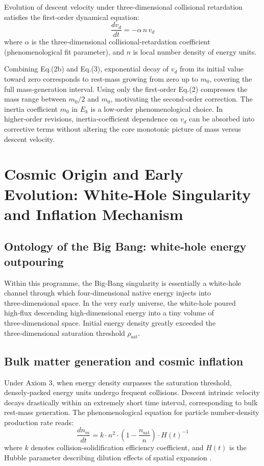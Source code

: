 \documentclass[12pt,a4paper]{article}
\begin{document}
Evolution of descent velocity under three‑dimensional collisional retardation satisfies the first‑order dynamical equation:
\begin{equation}
\frac{dv_d}{dt}=-\alpha\, n\, v_d
\end{equation}
where $\alpha$ is the three‑dimensional collisional‑retardation coefficient (phenomenological fit parameter), and $n$ is local number density of energy units.

Combining Eq.(2b) and Eq.(3), exponential decay of $v_d$ from its initial value toward zero corresponds to rest‑mass growing from zero up to $m_0$, covering the full mass‑generation interval. Using only the first‑order Eq.(2) compresses the mass range between $m_0/2$ and $m_0$, motivating the second‑order correction. The inertia coefficient $m_0$ in $E_k$ is a low‑order phenomenological choice. In higher‑order revisions, inertia‑coefficient dependence on $v_d$ can be absorbed into corrective terms without altering the core monotonic picture of mass versus descent velocity.

\section{Cosmic Origin and Early Evolution: White‑Hole Singularity and Inflation Mechanism}
\subsection{Ontology of the Big Bang: white‑hole energy outpouring}
Within this programme, the Big‑Bang singularity is essentially a white‑hole channel through which four‑dimensional native energy injects into three‑dimensional space. In the very early universe, the white‑hole poured high‑flux descending high‑dimensional energy into a tiny volume of three‑dimensional space. Initial energy density greatly exceeded the three‑dimensional saturation threshold $\rho_{\text{sat}}$.

\subsection{Bulk matter generation and cosmic inflation}
Under Axiom 3, when energy density surpasses the saturation threshold, densely‑packed energy units undergo frequent collisions. Descent intrinsic velocity decays drastically within an extremely short time interval, corresponding to bulk rest‑mass generation. The phenomenological equation for particle number‑density production rate reads:
\begin{equation}
\frac{dn_m}{dt}=k\cdot n^2\cdot\left(1-\frac{n_{\text{sat}}}{n}\right)\cdot H(t)^{-1}
\end{equation}
where $k$ denotes collision‑solidification efficiency coefficient, and $H(t)$ is the Hubble parameter describing dilution effects of spatial expansion \cite{friedmann1922,hubble1929}.
\end{document}
